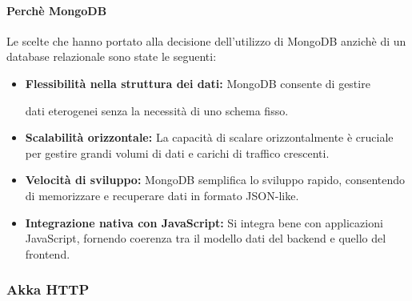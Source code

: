 \paragraph{Perchè MongoDB}

Le scelte che hanno portato alla decisione dell'utilizzo di MongoDB anzichè
di un database relazionale sono state le seguenti:

\begin{itemize}
      \item \textbf{Flessibilità nella struttura dei dati:} MongoDB consente di gestire

            dati eterogenei senza la necessità di uno schema fisso.

      \item \textbf{Scalabilità orizzontale:} La capacità di scalare orizzontalmente è
            cruciale per gestire grandi volumi di dati e carichi di traffico crescenti.

      \item \textbf{Velocità di sviluppo:} MongoDB semplifica lo sviluppo rapido,
            consentendo di memorizzare e recuperare dati in formato JSON-like.

      \item \textbf{Integrazione nativa con JavaScript:} Si integra bene con applicazioni
            JavaScript, fornendo coerenza tra il modello dati del backend e quello del frontend.
\end{itemize}

\subsubsection{Akka HTTP}







